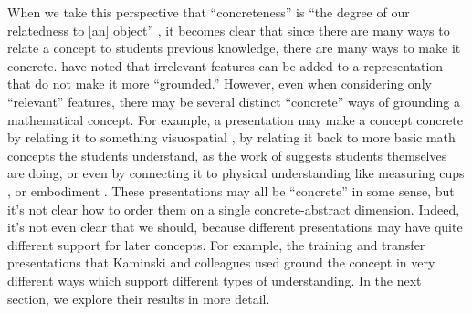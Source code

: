 \documentclass[man,10pt]{apa6}
\begin{document}
When we take this perspective that ``concreteness'' is ``the degree of our relatedness to [an] object'' \cite{Wilensky1991}, it becomes clear that since there are many ways to relate a concept to students previous knowledge, there are many ways to make it concrete.  have noted that irrelevant features can be added to a representation that do not make it more ``grounded.'' However, even when considering only ``relevant'' features, there may be several distinct ``concrete'' ways of grounding a mathematical concept. For example, a presentation may make a concept concrete by relating it to something visuospatial \cite{Rau2016}, by relating it back to more basic math concepts the students understand, as the work of  suggests students themselves are doing, or even by connecting it to physical understanding like measuring cups \cite{Kaminski2008}, or embodiment \cite{Nathan2008}. These presentations may all be ``concrete'' in some sense, but it's not clear how to order them on a single concrete-abstract dimension. Indeed, it's not even clear that we should, because different presentations may have quite different support for later concepts. For example, the training and transfer presentations that Kaminski and colleagues used ground the concept in very different ways which support different types of understanding. In the next section, we explore their results in more detail. 
\end{document}
